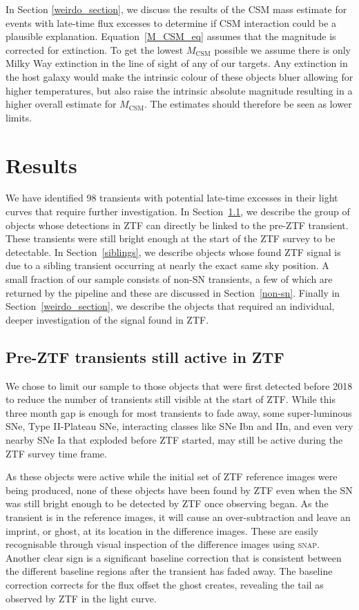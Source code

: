 \documentclass[a4paper,oneside,12pt, class=Latex/Classes/PhDthesisPSnPDF, crop=false]{standalone}
\begin{document}
In Section \ref{weirdo_section}, we discuss the results of the CSM mass estimate for events with late-time flux excesses to determine if CSM interaction could be a plausible explanation. Equation~\ref{M_CSM_eq} assumes that the magnitude is corrected for extinction. To get the lowest $M_\text{CSM}$ possible we assume there is only Milky Way extinction in the line of sight of any of our targets. Any extinction in the host galaxy would make the intrinsic colour of these objects bluer allowing for higher temperatures, but also raise the intrinsic absolute magnitude resulting in a higher overall estimate for $M_\text{CSM}$. The estimates should therefore be seen as lower limits.


\section{Results}
\label{results}

We have identified 98 transients with potential late-time excesses in their light curves that require further investigation. In Section~\ref{tails}, we describe the group of objects whose detections in ZTF can directly be linked to the pre-ZTF transient. These transients were still bright enough at the start of the ZTF survey to be detectable. In Section~\ref{siblings}, we describe objects whose found ZTF signal is due to a sibling transient occurring at nearly the exact same sky position. A small fraction of our sample consists of non-SN transients, a few of which are returned by the pipeline and these are discussed in Section~\ref{non-sn}. Finally in Section~\ref{weirdo_section}, we describe the objects that required an individual, deeper investigation of the signal found in ZTF.


\subsection{Pre-ZTF transients still active in ZTF}
\label{tails}

We chose to limit our sample to those objects that were first detected before 2018 to reduce the number of transients still visible at the start of ZTF. While this three month gap is enough for most transients to fade away, some super-luminous SNe, Type II-Plateau SNe, interacting classes like SNe Ibn and IIn, and even very nearby SNe Ia that exploded before ZTF started, may still be active during the ZTF survey time frame.

As these objects were active while the initial set of ZTF reference images were being produced, none of these objects have been found by ZTF even when the SN was still bright enough to be detected by ZTF once observing began. As the transient is in the reference images, it will cause an over-subtraction and leave an imprint, or ghost, at its location in the difference images. These are easily recognisable through visual inspection of the difference images using \textsc{snap}. Another clear sign is a significant baseline correction that is consistent between the different baseline regions after the transient has faded away. The baseline correction corrects for the flux offset the ghost creates, revealing the tail as observed by ZTF in the light curve.
\end{document}
